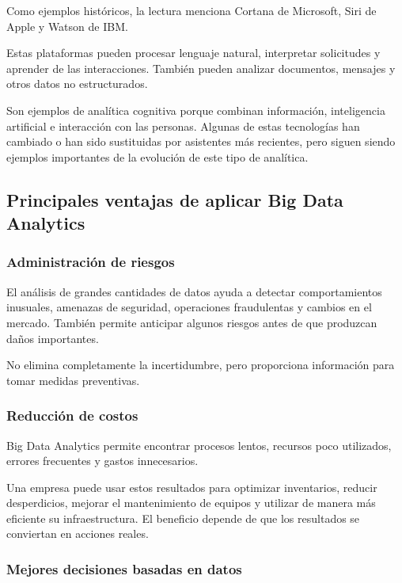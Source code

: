 Como ejemplos históricos, la lectura menciona Cortana de Microsoft, Siri de
Apple y Watson de IBM.

Estas plataformas pueden procesar lenguaje natural, interpretar solicitudes y
aprender de las interacciones. También pueden analizar documentos, mensajes y
otros datos no estructurados.

Son ejemplos de analítica cognitiva porque combinan información, inteligencia
artificial e interacción con las personas. Algunas de estas tecnologías han
cambiado o han sido sustituidas por asistentes más recientes, pero siguen
siendo ejemplos importantes de la evolución de este tipo de analítica.

\subsection{Principales ventajas de aplicar Big Data Analytics}

\subsubsection*{Administración de riesgos}

El análisis de grandes cantidades de datos ayuda a detectar comportamientos
inusuales, amenazas de seguridad, operaciones fraudulentas y cambios en el
mercado. También permite anticipar algunos riesgos antes de que produzcan
daños importantes.

No elimina completamente la incertidumbre, pero proporciona información para
tomar medidas preventivas.

\subsubsection*{Reducción de costos}

Big Data Analytics permite encontrar procesos lentos, recursos poco utilizados,
errores frecuentes y gastos innecesarios.

Una empresa puede usar estos resultados para optimizar inventarios, reducir
desperdicios, mejorar el mantenimiento de equipos y utilizar de manera más
eficiente su infraestructura. El beneficio depende de que los resultados se
conviertan en acciones reales.

\subsubsection*{Mejores decisiones basadas en datos}

